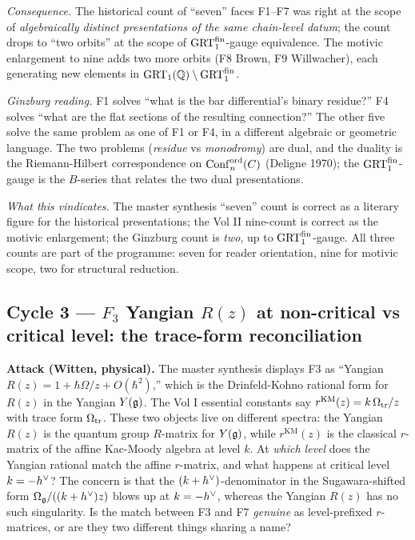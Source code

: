 \emph{Consequence.}
The historical count of ``seven'' faces F1--F7 was right at the scope
of \emph{algebraically distinct presentations of the same chain-level
datum}; the count drops to ``two orbits'' at the scope of
$\GRTfin$-gauge equivalence. The motivic enlargement to nine adds two
more orbits (F8 Brown, F9 Willwacher), each generating new elements in
$\GRT(\QQ) \setminus \GRTfin$.

\emph{Ginzburg reading.}
F1 solves ``what is the bar differential's binary residue?''
F4 solves ``what are the flat sections of the resulting connection?''
The other five solve the same problem as one of F1 or F4, in a different
algebraic or geometric language. The two problems
(\emph{residue} vs \emph{monodromy}) are dual, and the duality is the
Riemann-Hilbert correspondence on $\Confnord[n]{C}$ (Deligne 1970); the
$\GRTfin$-gauge is the $B$-series that relates the two dual
presentations.

\emph{What this vindicates.}
The master synthesis ``seven'' count is correct as a literary figure
for the historical presentations; the Vol II nine-count is correct as
the motivic enlargement; the Ginzburg count is \emph{two}, up to
$\GRTfin$-gauge. All three counts are part of the programme: seven for
reader orientation, nine for motivic scope, two for structural reduction.

\subsection*{Cycle 3 --- $F_3$ Yangian $R(z)$ at non-critical vs critical level: the trace-form reconciliation}

\textbf{Attack (Witten, physical).}
The master synthesis displays F3 as ``Yangian $R(z) = 1 + \hbar\Omega/z + O(\hbar^2)$,''
which is the Drinfeld-Kohno rational form for $R(z)$ in the Yangian
$Y(\fg)$. The Vol I essential constants say
$r^{\mathrm{KM}}(z) = k\,\Omtr/z$ with trace form $\Omtr$. These two
objects live on different spectra: the Yangian $R(z)$ is the quantum
group $R$-matrix for $Y(\fg)$, while $r^{\mathrm{KM}}(z)$ is the
classical $r$-matrix of the affine Kac-Moody algebra at level $k$. At
\emph{which level} does the Yangian rational match the affine
$r$-matrix, and what happens at critical level $k = -\hv$? The concern
is that the $(k + \hv)$-denominator in the Sugawara-shifted form
$\Omega_\fg/((k + \hv) z)$ blows up at $k = -\hv$, whereas the Yangian
$R(z)$ has no such singularity. Is the match between F3 and F7
\emph{genuine} as level-prefixed $r$-matrices, or are they two different
things sharing a name?

